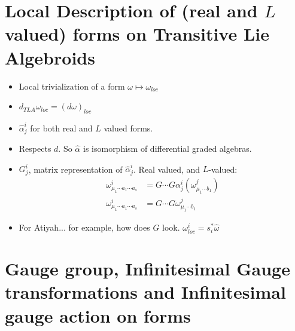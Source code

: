 \section{Local Description of (real and $L$ valued) forms on Transitive Lie Algebroids}

\begin{itemize}
    
\item Local trivialization of a form $\omega \mapsto \omega_{loc}$

\item $d_{TLA}\omega_{loc} = (d \omega)_{loc}$

\item $\hat \alpha^i_j$ for both real and $L$ valued forms.

\item Respects $d$. So $\hat \alpha$ is isomorphism of differential graded algebras.

\item $G^i_j$, matrix representation of $\hat \alpha^i_j$. Real valued, and $L$-valued:
    \begin{align}
        \omega^i_{\mu_1 \cdots a_1 \cdots a_s} &= G\cdots G \alpha^i_j(\omega^j_{\mu_1 \cdots b_1}) \\
        \omega^i_{\mu_1 \cdots a_1 \cdots a_s} &= G\cdots G \omega^j_{\mu_1 \cdots b_1}
    \end{align}

\item For Atiyah... for example, how does $G$ look. $\omega^i_{loc} = s_i^* \hat \omega$
    
\end{itemize}

\section{Gauge group, Infinitesimal Gauge transformations and Infinitesimal gauge action on forms}

